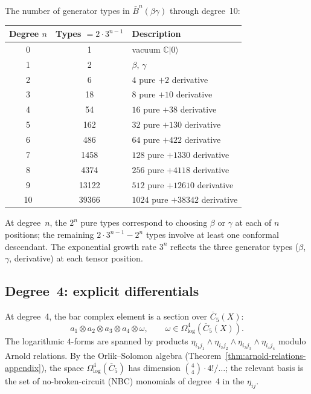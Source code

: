 \begin{computation}
\label{comp:betagamma-dim-table}
The number of generator types in $\bar{B}^n(\beta\gamma)$ through degree~10:
\begin{center}
\begin{tabular}{ccl}
\toprule
Degree $n$ & Types $= 2 \cdot 3^{n-1}$ & Description \\
\midrule
0 & 1 & vacuum $\mathbb{C}|0\rangle$ \\
1 & 2 & $\beta$, $\gamma$ \\
2 & 6 & $4$ pure $+ 2$ derivative \\
3 & 18 & $8$ pure $+ 10$ derivative \\
4 & 54 & $16$ pure $+ 38$ derivative \\
5 & 162 & $32$ pure $+ 130$ derivative \\
6 & 486 & $64$ pure $+ 422$ derivative \\
7 & 1458 & $128$ pure $+ 1330$ derivative \\
8 & 4374 & $256$ pure $+ 4118$ derivative \\
9 & 13122 & $512$ pure $+ 12610$ derivative \\
10 & 39366 & $1024$ pure $+ 38342$ derivative \\
\bottomrule
\end{tabular}
\end{center}
At degree~$n$, the $2^n$ pure types correspond to choosing $\beta$ or
$\gamma$ at each of $n$ positions; the remaining $2 \cdot 3^{n-1} - 2^n$
types involve at least one conformal descendant.  The exponential growth
rate $3^n$ reflects the three generator types ($\beta$, $\gamma$, derivative)
at each tensor position.
\end{computation}

\subsection{Degree~4: explicit differentials}

At degree~4, the bar complex element is a section over $\overline{C}_5(X)$:
\[
a_1 \otimes a_2 \otimes a_3 \otimes a_4 \otimes \omega,
\qquad \omega \in \Omega^4_{\log}(\overline{C}_5(X)).
\]
The logarithmic $4$-forms are spanned by products
$\eta_{i_1 j_1} \wedge \eta_{i_2 j_2} \wedge \eta_{i_3 j_3} \wedge \eta_{i_4 j_4}$
modulo Arnold relations.  By the Orlik--Solomon algebra
(Theorem~\ref{thm:arnold-relations-appendix}), the space
$\Omega^4_{\log}(\overline{C}_5)$ has dimension
$\binom{4}{4} \cdot 4! / \ldots$; the relevant basis is the set of
no-broken-circuit (NBC) monomials of degree~4 in the $\eta_{ij}$.

